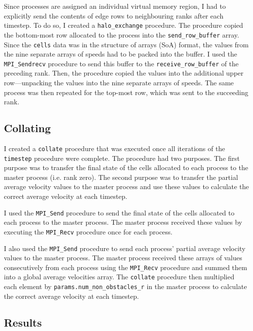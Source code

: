 \documentclass[twocolumn, a4paper]{article}
\begin{document}
Since processes are assigned an individual virtual memory region, I had to explicitly send the contents of edge rows to neighbouring ranks after each timestep.
To do so, I created a \texttt{halo\_exchange} procedure.
The procedure copied the bottom-most row allocated to the process into the \texttt{send\_row\_buffer} array.
Since the \texttt{cells} data was in the structure of arrays (SoA) format, the values from the nine separate arrays of speeds had to be packed into the buffer.
I used the \texttt{MPI\_Sendrecv} procedure to send this buffer to the \texttt{receive\_row\_buffer} of the preceding rank.
Then, the procedure copied the values into the additional upper row---unpacking the values into the nine separate arrays of speeds.
The same process was then repeated for the top-most row, which was sent to the succeeding rank.

\subsection{Collating}

I created a \texttt{collate} procedure that was executed once all iterations of the \texttt{timestep} procedure were complete.
The procedure had two purposes.
The first purpose was to transfer the final state of the cells allocated to each process to the master process (i.e. rank zero).
The second purpose was to transfer the partial average velocity values to the master process and use these values to calculate the correct average velocity at each timestep.

I used the \texttt{MPI\_Send} procedure to send the final state of the cells allocated to each process to the master process.
The master process received these values by executing the \texttt{MPI\_Recv} procedure once for each process.

I also used the \texttt{MPI\_Send} procedure to send each process' partial average velocity values to the master process.
The master process received these arrays of values consecutively from each process using the \texttt{MPI\_Recv} procedure and summed them into a global average velocities array.
The \texttt{collate} procedure then multiplied each element by \texttt{params.num\_non\_obstacles\_r} in the master process to calculate the correct average velocity at each timestep.

\subsection{Results}
\end{document}
